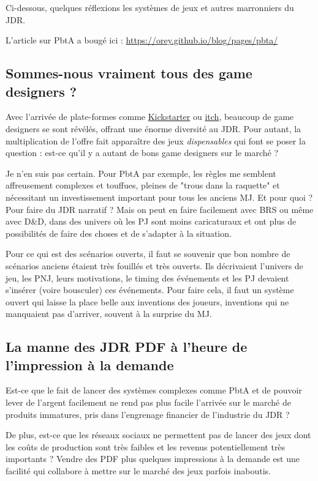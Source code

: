 \documentclass[a4paper, 11pt, twoside]{article}
\begin{document}
Ci-dessous, quelques réflexions les systèmes de jeux et autres marronniers du JDR.

L'article sur PbtA a bougé ici : \url{https://orey.github.io/blog/pages/pbta/}

\subsection{Sommes-nous vraiment tous des game designers ?}
\label{sec:orgc6ead9e}

Avec l'arrivée de plate-formes comme \href{https://www.kickstarter.com}{Kickstarter} ou \href{https://itch.io}{itch}, beaucoup de game designers se sont révélés, offrant une énorme diversité au JDR. Pour autant, la multiplication de l'offre fait apparaître des jeux \emph{dispensables} qui font se poser la question : est-ce qu'il y a autant de bons game designers sur le marché ?

Je n'en suis pas certain. Pour PbtA par exemple, les règles me semblent affreusement complexes et touffues, pleines de "trous dans la raquette" et nécessitant un investissement important pour tous les anciens MJ. Et pour quoi ? Pour faire du JDR narratif ? Mais on peut en faire facilement avec BRS ou même avec D\&D, dans des univers où les PJ sont moins caricaturaux et ont plus de possibilités de faire des choses et de s'adapter à la situation.

Pour ce qui est des scénarios ouverts, il faut se souvenir que bon nombre de scénarios anciens étaient très fouillés et très ouverts. Ils décrivaient l'univers de jeu, les PNJ, leurs motivations, le timing des événements et les PJ devaient s'insérer (voire bousculer) ces événements. Pour faire cela, il faut un système ouvert qui laisse la place belle aux inventions des joueurs, inventions qui ne manquaient pas d'arriver, souvent à la surprise du MJ.

\subsection{La manne des JDR PDF à l'heure de l'impression à la demande}
\label{sec:orgef9000d}

Est-ce que le fait de lancer des systèmes complexes comme PbtA et de pouvoir lever de l'argent facilement ne rend pas plus facile l'arrivée sur le marché de produits immatures, pris dans l'engrenage financier de l'industrie du JDR ?

De plus, est-ce que les réseaux sociaux ne permettent pas de lancer des jeux dont les coûts de production sont très faibles et les revenus potentiellement très importants ? Vendre des PDF plus quelques impressions à la demande est une facilité qui collabore à mettre sur le marché des jeux parfois inaboutis.
\end{document}
